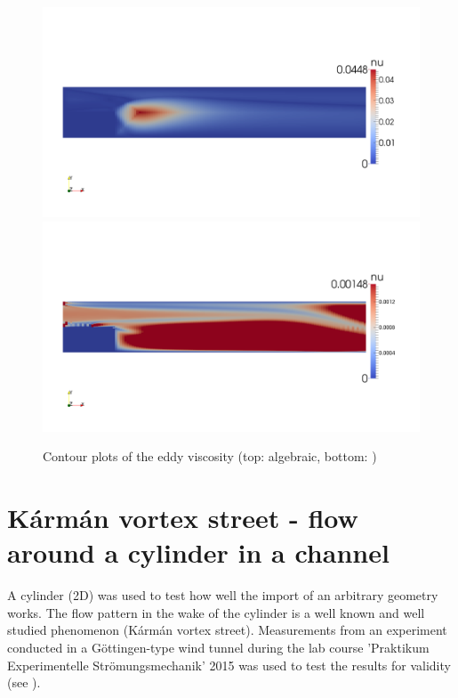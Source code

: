 \begin{figure}
\centering
\includegraphics[trim=0 200 0 200,clip,width=1.0\textwidth]{FIGURES/bfs-aturb.png}
\includegraphics[trim=0 200 0 200,clip,width=1.0\textwidth]{FIGURES/bfs-ke.png}
\caption{Contour plots of the eddy viscosity (top: algebraic, bottom: \ke)}
\label{fig:bfsnut}
\end{figure}


\clearpage
\section{K\'{a}rm\'{a}n vortex street - flow around a cylinder in a channel} %
\label{sec:karman_vortex_street_flow_around_a_cylinder_in_a_channel}

A cylinder (2D) was used to test how well the import of an arbitrary geometry works. The flow pattern in the wake of the cylinder is a well known and well studied phenomenon (K\'{a}rm\'{a}n vortex street). Measurements from an experiment conducted in a G\"ottingen-type wind tunnel during the lab course 'Praktikum Experimentelle Str\"omungsmechanik' 2015 was used to test the results for validity (see \citep{koehler2015}).

